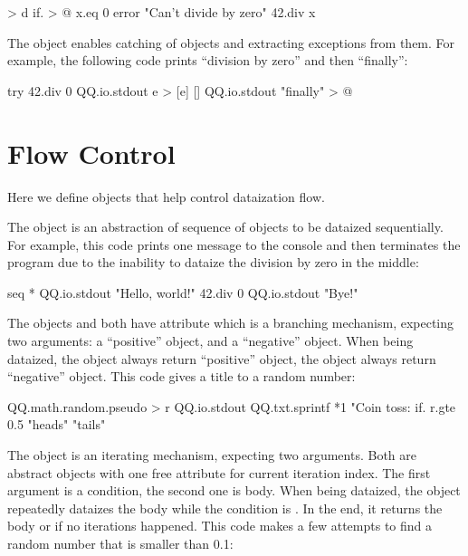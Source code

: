 \documentclass[sigplan,nonacm]{acmart}
\newcommand\aff[1]{\ff{\textcolor{gray}{\(\star\)}#1}}
\newcommand\deff[1]{\ff{\textcolor{blue!50!black}{\textbf{#1}}}}
\newcommand\adeff[1]{\aff{\textcolor{blue!50!black}{\textbf{#1}}}}
\begin{document}
\begin{ffcode}
[x] > d
  if. > @
    x.eq 0
    error "Can't divide by zero"
    42.div x
\end{ffcode}

The \adeff{try} object enables catching of \aff{error} objects and extracting exceptions from them.
For example, the following code prints ``division by zero'' and then ``finally'':

\begin{ffcode}
try
  42.div 0
  QQ.io.stdout e > [e]
  []
    QQ.io.stdout "finally" > @
\end{ffcode}

\section{Flow Control}\label{sec:flow}

Here we define objects that help control dataization flow.

The \deff{seq} object is an abstraction of sequence of objects to be dataized sequentially.
For example, this code prints one message to the console and then terminates the program due to 
the inability to dataize the division by zero in the middle:

\begin{ffcode}
seq *
  QQ.io.stdout "Hello, world!"
  42.div 0
  QQ.io.stdout "Bye!"
\end{ffcode}

The objects  and  both have attribute \deff{if} which is a branching mechanism, 
expecting two arguments: a ``positive'' object, and a ``negative'' object. When
being dataized, the object  always return ``positive'' object,
the object  always return ``negative'' object.
This code gives a title to a random number:

\begin{ffcode}
QQ.math.random.pseudo > r
QQ.io.stdout
  QQ.txt.sprintf *1
    "Coin toss: %
    if.
      r.gte 0.5
      "heads"
      "tails"
\end{ffcode}

The \deff{while} object is an iterating mechanism, expecting two arguments.
Both are abstract objects with one free attribute for current iteration index.
The first argument is a condition, the second one is body.
When being dataized, the object  repeatedly dataizes the body while the condition is .
In the end, it returns the body or  if no iterations happened.
This code makes a few attempts to find a random number that is smaller than 0.1:
\end{document}
